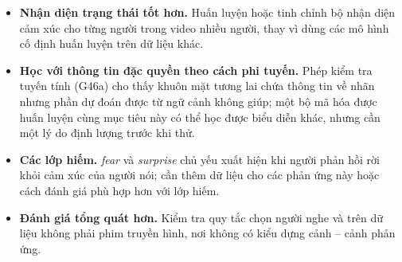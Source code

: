 \begin{itemize}
	\item \textbf{Nhận diện trạng thái tốt hơn.} Huấn luyện hoặc tinh chỉnh bộ nhận diện cảm xúc cho từng người trong video nhiều người, thay vì dùng các mô hình cố định huấn luyện trên dữ liệu khác.
	\item \textbf{Học với thông tin đặc quyền theo cách phi tuyến.} Phép kiểm tra tuyến tính (G46a) cho thấy khuôn mặt tương lai chứa thông tin về nhãn nhưng phần dự đoán được từ ngữ cảnh không giúp; một bộ mã hóa được huấn luyện cùng mục tiêu này có thể học được biểu diễn khác, nhưng cần một lý do định lượng trước khi thử.
	\item \textbf{Các lớp hiếm.} \emph{fear} và \emph{surprise} chủ yếu xuất hiện khi người phản hồi rời khỏi cảm xúc của người nói; cần thêm dữ liệu cho các phản ứng này hoặc cách đánh giá phù hợp hơn với lớp hiếm.
	\item \textbf{Đánh giá tổng quát hơn.} Kiểm tra quy tắc chọn người nghe và \model{} trên dữ liệu không phải phim truyền hình, nơi không có kiểu dựng cảnh -- cảnh phản ứng.
\end{itemize}
